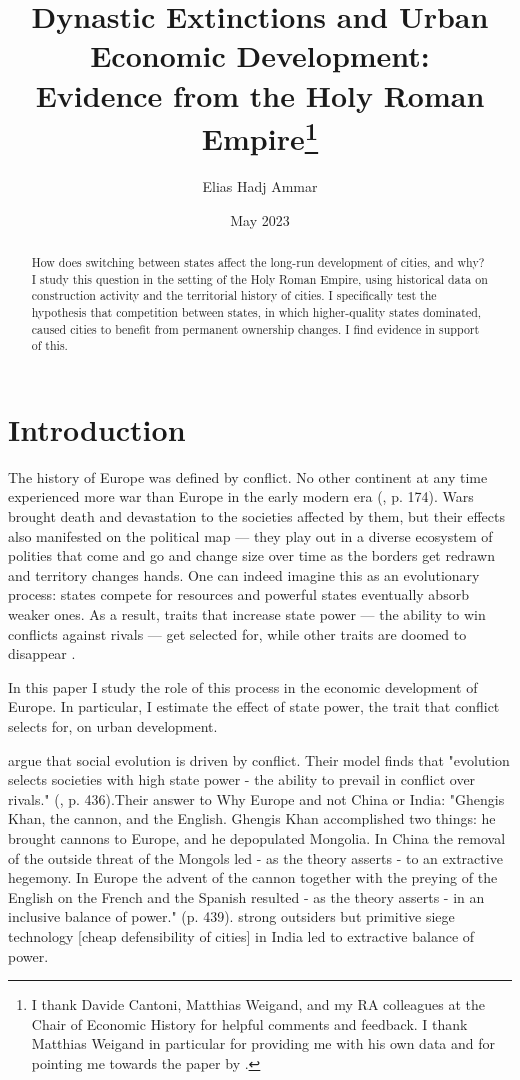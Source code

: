 \documentclass{article}
\title{Dynastic Extinctions and Urban Economic Development: \\Evidence from the Holy Roman Empire\footnote{
I thank Davide Cantoni, Matthias Weigand, and my RA colleagues at the Chair of Economic History for helpful comments and feedback. I thank Matthias Weigand in particular for providing me with his own data and for pointing me towards the paper by \cite{schoenholzer2022}.
}
}
\author{Elias Hadj Ammar}
\date{May 2023}
\begin{document}
\onehalfspacing
\maketitle
\thispagestyle{empty}

\begin{abstract}
How does switching between states affect the long-run development of cities, and why? I study this question in the setting of the Holy Roman Empire, using historical data on construction activity and the territorial history of cities. I specifically test the hypothesis that competition between states, in which higher-quality states dominated, caused cities to benefit from permanent ownership changes. I find evidence in support of this.
\end{abstract}

\newpage

\setcounter{page}{1}
\doublespacing



\section{Introduction}



The history of Europe was defined by conflict. No other continent at any time experienced more war than Europe in the early modern era (\citealp{voigtlnder2013}, p. 174). Wars brought death and devastation to the societies affected by them, but their effects also manifested on the political map --- they play out in a diverse ecosystem of polities that come and go and change size over time as the borders get redrawn and territory changes hands. One can indeed imagine this as an evolutionary process: states compete for resources and powerful states eventually absorb weaker ones. As a result, traits that increase state power --- the ability to win conflicts against rivals --- get selected for, while other traits are doomed to disappear \citep{levine2013, levine2021}.

In this paper I study the role of this process in the economic development of Europe. In particular, I estimate the effect of state power, the trait that conflict selects for, on urban development. 




\cite{levine2013, levine2021} argue that social evolution is driven by conflict. Their model finds that "evolution selects societies with high state power - the ability to prevail in conflict over rivals." (\citealp{levine2021}, p. 436).Their answer to Why Europe and not China or India: "Ghengis Khan, the cannon, and the English. Ghengis Khan accomplished two things: he brought cannons to Europe, and he depopulated Mongolia. In China the removal of the outside threat of the Mongols led - as the theory asserts - to an extractive hegemony. In Europe the advent of the cannon together with the preying of the English on the French and the Spanish resulted - as the theory asserts - in an inclusive balance of power." (p. 439). strong outsiders but primitive siege technology [cheap defensibility of cities] in India led to extractive balance of power.  
\end{document}

